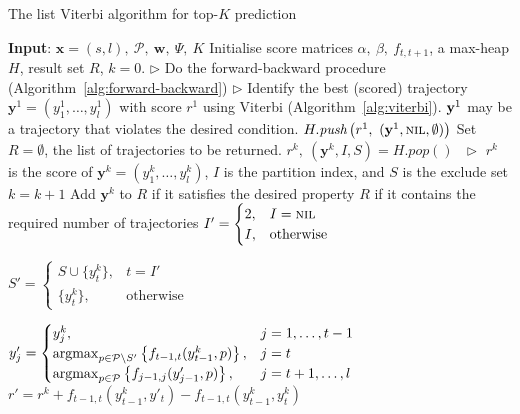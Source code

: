 \begin{algorithm}[htbp]
\caption{The list Viterbi algorithm for top-$K$ prediction~\cite{nilsson2001sequentially,seshadri1994list}}
\label{alg:listviterbi}
\begin{algorithmic}[1]
\STATE \textbf{Input}: $\mathbf{x}=(s, l),~ \mathcal{P},~ \mathbf{w},~ \Psi, ~K$
\STATE Initialise score matrices $\alpha,~ \beta,~ f_{t, t+1}$, a max-heap $H$, result set $R$, $k=0$.
\STATE $\triangleright$ Do the forward-backward procedure (Algorithm~\ref{alg:forward-backward})
\STATE $\triangleright$ Identify the best (scored) trajectory $\mathbf{y}^1=(y_1^1,\dots,y_l^1)$
       with score $r^1$ using Viterbi (Algorithm~\ref{alg:viterbi}). $\mathbf{y}^1$ may be a trajectory that violates the desired condition.
\STATE $H.\textit{push}\left(r^1,~ (\mathbf{y}^1, \textsc{nil}, \emptyset) \right)$
\STATE Set $R=\emptyset$, the list of trajectories to be returned.
    \STATE $r^k,~ (\mathbf{y}^k, I, S) = H.\textit{pop}()~~~ \triangleright$
           $r^k$ is the score of $\mathbf{y}^k=(y_1^k,\dots,y_l^k)$, $I$ is the partition index, and $S$ is the exclude set
    \STATE $k = k + 1$
    \STATE Add $\mathbf{y}^k$ to $R$ if it satisfies the desired property
    \RETURN $R$ if it contains the required number of trajectories
    \STATE $I' = \begin{cases}
                  2, & I = \textsc{nil} \\
                  I, & \text{otherwise}
                 \end{cases}$

        \STATE $S' = \begin{cases}
                      S \cup \{ y_t^k \}, & t = I' \\
                      \{ y_t^k \},        & \text{otherwise}
                     \end{cases}$

        \STATE $y'_j = \begin{cases}
                            y_j^k,                                                                             & j=1,\dots,t-1 \\
                            \operatorname*{argmax}_{p \in \mathcal{P} \setminus S'} \left\{ f_{t-1,t}(y_{t-1}^k, p) \right\}, & j=t \\
                            \operatorname*{argmax}_{p \in \mathcal{P}} \left\{ f_{j-1, j}(y'_{j-1}, p) \right\},              & j=t+1,\dots,l
                \end{cases}$
        \STATE \vspace{3pt}$r' = r^k + f_{t-1,t}(y_{t-1}^k, y'_t) - f_{t-1,t}(y_{t-1}^k, y_t^k)$


\end{algorithmic}
\end{algorithm}
